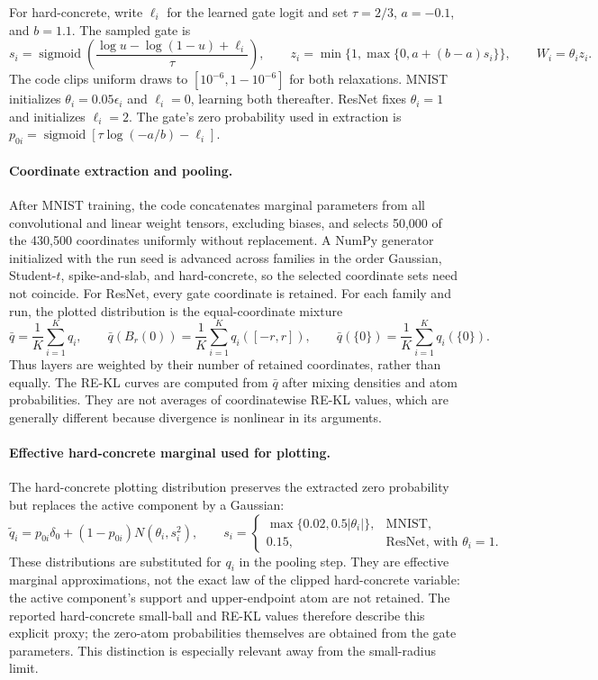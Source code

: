 \documentclass[11pt,a4paper]{article}
\theoremstyle{compactplain}
\theoremstyle{compactdefinition}
\numberwithin{equation}{section}
\begin{document}
For hard-concrete, write \(\ell_i\) for the learned gate logit and set
\(\tau=2/3\), \(a=-0.1\), and \(b=1.1\). The sampled gate is
\[
 s_i=\operatorname{sigmoid}\!\left(
 \frac{\log u-\log(1-u)+\ell_i}{\tau}\right),
 \qquad
 z_i=\min\{1,\max\{0,a+(b-a)s_i\}\},
 \qquad W_i=\theta_i z_i.
\]
The code clips uniform draws to \([10^{-6},1-10^{-6}]\) for both
relaxations. MNIST initializes \(\theta_i=0.05\epsilon_i\) and
\(\ell_i=0\), learning both thereafter. ResNet fixes \(\theta_i=1\)
and initializes \(\ell_i=2\). The gate's zero probability used in
extraction is
\(p_{0i}=\operatorname{sigmoid}[\tau\log(-a/b)-\ell_i]\).

\paragraph{Coordinate extraction and pooling.}
After MNIST training, the code concatenates marginal parameters from
all convolutional and linear weight tensors, excluding biases, and
selects 50,000 of the 430,500 coordinates uniformly without replacement.
A NumPy generator initialized with the run seed is advanced across
families in the order Gaussian, Student-\(t\), spike-and-slab, and
hard-concrete, so the selected coordinate sets need not coincide.
For ResNet, every gate coordinate is retained. For each family and run,
the plotted distribution is the equal-coordinate mixture
\[
 \bar q=\frac1K\sum_{i=1}^K q_i,
 \qquad
 \bar q(B_r(0))=\frac1K\sum_{i=1}^K q_i([-r,r]),
 \qquad
 \bar q(\{0\})=\frac1K\sum_{i=1}^K q_i(\{0\}).
\]
Thus layers are weighted by their number of retained coordinates,
rather than equally. The RE-KL curves are computed from \(\bar q\)
after mixing densities and atom probabilities. They are not averages
of coordinatewise RE-KL values, which are generally different because
divergence is nonlinear in its arguments.

\paragraph{Effective hard-concrete marginal used for plotting.}
The hard-concrete plotting distribution preserves the extracted zero
probability but replaces the active component by a Gaussian:
\[
 \widetilde q_i=p_{0i}\delta_0+(1-p_{0i})N(\theta_i,s_i^2),
 \qquad
 s_i=\begin{cases}
 \max\{0.02,0.5|\theta_i|\},&\text{MNIST},\\
 0.15,&\text{ResNet, with }\theta_i=1.
 \end{cases}
\]
These distributions are substituted for \(q_i\) in the pooling step.
They are effective marginal approximations, not the exact law of the
clipped hard-concrete variable: the active component's support and
upper-endpoint atom are not retained. The reported hard-concrete
small-ball and RE-KL values therefore describe this explicit proxy;
the zero-atom probabilities themselves are obtained from the gate
parameters. This distinction is especially relevant away from the
small-radius limit.
\end{document}
